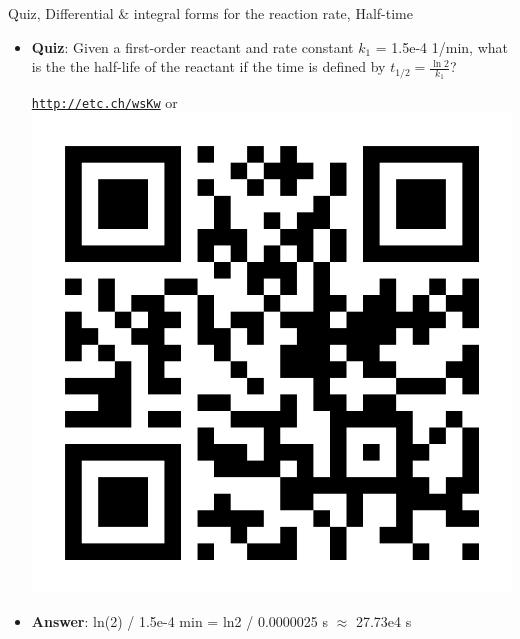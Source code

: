 %
\begin{frame}{Quiz, Differential \& integral forms for the reaction rate, Half-time}
	\begin{itemize}
		\item \alert{\bf Quiz}: Given a first-order reactant and rate constant  $k_1$ = 1.5e-4 1/min, what is the the half-life of the reactant if the time is defined by  $t_{1/2} = \tfrac{\ln 2}{k_1}$?
		\begin{center}
			\href{http://etc.ch/wsKw}{\textcolor{indigo(dye)}{\tt http://etc.ch/wsKw}} 
			\quad or \quad  
			\includegraphics[height=0.2\columnwidth]{figures/chemical-kinetics/polls.png}
		\end{center}
 		\hiddenpause 
 		\vskip 10pt
 		\item {\bf Answer}: ln(2) / 1.5e-4 min = 
 		ln2 / 0.0000025 s $\approx$ 27.73e4 s
	\end{itemize}
\end{frame}
%
